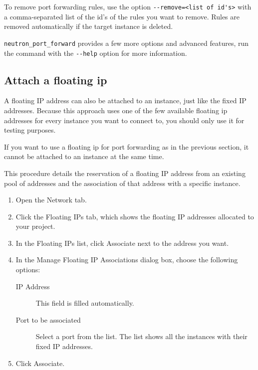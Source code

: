 \begin{prompt}
\end{prompt}

To remove port forwarding rules, use the option
\lstinline{--remove=<list of id's>} with a comma-separated list of the
id's of the rules you want to remove.  Rules are removed automatically
if the target instance is deleted.

\lstinline{neutron_port_forward} provides a few more options and
advanced features, run the command with the \lstinline{--help} option
for more information.

\subsection*{Attach a floating ip}
A floating IP address can also be attached to an instance, just like
the fixed IP addresses.  Because this approach uses one of the few
available floating ip addresses for every instance you want to connect
to, you should only use it for testing purposes.

 If you want to use a floating ip for port forwarding as
in the previous section, it cannot be attached to an instance at the
same time.

This procedure details the reservation of a floating IP address from
an existing pool of addresses and the association of that address with
a specific instance.

\begin{enumerate}
\item Open the Network tab.
\item Click the Floating IPs tab, which shows the floating IP
  addresses allocated to your project.
\item In the Floating IPs list, click Associate next to the address you want.
\item In the Manage Floating IP Associations dialog box, choose the
  following options:

  \begin{description}
  \item[IP Address] This field is filled automatically.
  \item[Port to be associated] Select a port from the list.  The list shows all the instances with their fixed IP addresses.
  \end{description}
\item Click Associate.
\end{enumerate}

